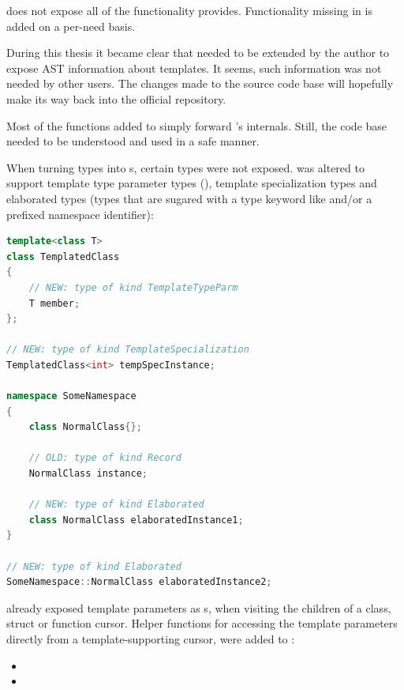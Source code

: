  does not expose all of the functionality  provides. Functionality missing in  is added on a per-need basis. 

During this thesis it became clear that  needed to be extended by the author to expose AST information about  templates. It seems, such information was not needed by other  users. The changes made to the  source code base will hopefully make its way back into the official  repository.

Most of the functions added to  simply forward 's internals. Still, the  code base needed to be understood and used in a safe  manner.

When turning  types into s, certain  types were not exposed.  was altered to support template type parameter types (), template specialization types and elaborated types (types that are sugared with a type keyword like  and/or a prefixed namespace identifier):

\SingleSpacing
\begin{lstlisting}[language=C++, caption=Examples of types now supported by \myProperName{libclang}]
template<class T>
class TemplatedClass
{
	// NEW: type of kind TemplateTypeParm
	T member; 
};

// NEW: type of kind TemplateSpecialization
TemplatedClass<int> tempSpecInstance; 

namespace SomeNamespace
{	
	class NormalClass{};
	
	// OLD: type of kind Record
	NormalClass instance;
	
	// NEW: type of kind Elaborated
	class NormalClass elaboratedInstance1;
}

// NEW: type of kind Elaborated
SomeNamespace::NormalClass elaboratedInstance2; 
\end{lstlisting}
\OnehalfSpacing

 already exposed template parameters as s, when visiting the children of a class, struct or function cursor. Helper functions for accessing the template parameters directly from a template-supporting cursor, were added to :

\begin{itemize}\addtolength{\itemsep}{-0.5\baselineskip}
\item {}
\item {}
\end{itemize}

